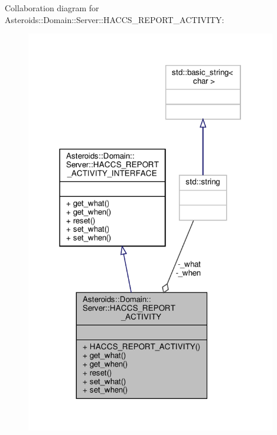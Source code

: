 Collaboration diagram for Asteroids\+:\+:Domain\+:\+:Server\+:\+:H\+A\+C\+C\+S\+\_\+\+R\+E\+P\+O\+R\+T\+\_\+\+A\+C\+T\+I\+V\+I\+TY\+:\nopagebreak
\begin{figure}[H]
\begin{center}
\leavevmode
\includegraphics[width=310pt]{classAsteroids_1_1Domain_1_1Server_1_1HACCS__REPORT__ACTIVITY__coll__graph}
\end{center}
\end{figure}
